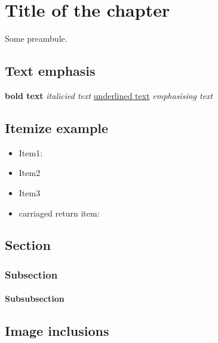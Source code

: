 \chapter{Title of the chapter}
\label{chap:title_of_the_chapter}
Some preambule.

\section{Text emphasis}

\textbf{bold text}
\textit{italicied text}
\underline{underlined text}
\emph{emphasising text}

\section{Itemize example}

\begin{itemize}
\item {Item1: \lipsum[1]}
\item {Item2}
\item {Item3}
\end{itemize}
\begin{itemize}
\item {carriaged return item:}
\end{itemize}
\lipsum[1]

\section{Section}

\lipsum[1]
\lipsum[2]

\subsection{Subsection}

\lipsum[1]

\subsubsection{Subsubsection}

\lipsum[1-2]

\section{Image inclusions}

